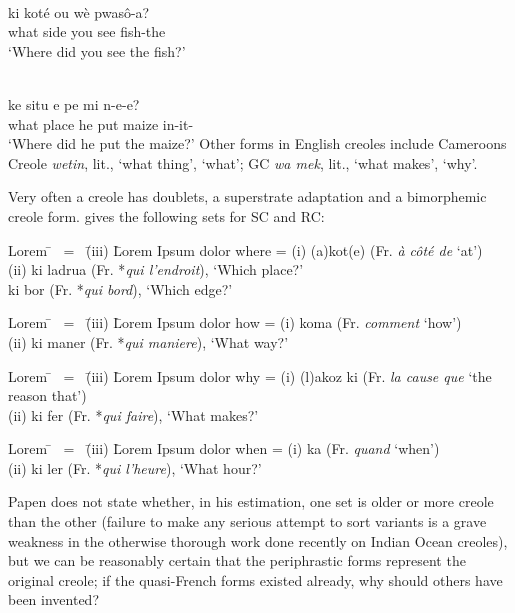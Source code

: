 \ea\label{ex:2:80}
\langinfo{\langHC}{}{}\\
\gll ki koté ou wè pwas{\^o}-a?\\
what side you see fish-the\\
\glt `Where did you see the fish?'
\z

\ea\label{ex:2:81}
\langinfo{\langST}{}{}\\
\gll ke situ e pe mi n-e-e?\\
what place he put maize in-it-\QP\\
\glt `Where did he put the maize?'
\z
Other forms in English creoles include Cameroons Creole \textit{wetin}, lit., `what thing', `what'; GC \textit{wa mek}, lit., `what makes', `why'.

Very often a creole has doublets, a superstrate adaptation and a bimorphemic creole form. \citet[509]{Papen1978} gives the following sets for SC and RC:


\ea\label{ex:2:82} \begin{tabbing}	Lorem \= ~{\rm =}~ \= {\rm (iii)} \= Lorem Ipsum dolor \kill
					where \> {\rm =} \> {\rm (i)} \> (a)kot(e) {\rm (Fr. {\it à côté de} `at')}\\
					\> \> {\rm (ii)} \> ki ladrua {\rm (Fr. *{\it qui l'endroit}), `Which place?'}\\
					\> \> \> ki bor {\rm (Fr. *{\it qui bord}), `Which edge?'}
					\end{tabbing}\z

\ea\label{ex:2:83} \begin{tabbing}	Lorem \= ~{\rm =}~ \= {\rm (iii)} \= Lorem Ipsum dolor \kill
					how \> {\rm =} \> {\rm (i)} \> koma {\rm (Fr. {\it comment} `how')}\\
					\> \> {\rm (ii)} \> ki maner {\rm (Fr. *{\it qui maniere}), `What way?'}\end{tabbing}\z

\ea\label{ex:2:84} \begin{tabbing}	Lorem \= ~{\rm =}~ \= {\rm (iii)} \= Lorem Ipsum dolor \kill
					why \> {\rm =} \> {\rm (i)} \> (l)akoz ki {\rm (Fr. {\it la cause que} `the reason that')}\\
					\> \> {\rm (ii)} \> ki fer {\rm (Fr. *{\it qui faire}), `What makes?'}\end{tabbing}\z

\ea\label{ex:2:85} \begin{tabbing}	Lorem \= ~{\rm =}~ \= {\rm (iii)} \= Lorem Ipsum dolor \kill
					when \> {\rm =} \> {\rm (i)} \> ka {\rm (Fr. {\it quand} `when')}\\
					\> \> {\rm (ii)} \> ki ler {\rm (Fr. *{\it qui l'heure}), `What hour?'}\end{tabbing}\z
Papen does not state whether, in his estimation, one set is older or more creole than the other (failure to make any serious attempt to sort variants is a grave weakness in the otherwise thorough work done recently on Indian Ocean creoles), but we can be reasonably certain that the periphrastic forms represent the original creole; if the quasi-French forms existed already, why should others have been invented?


